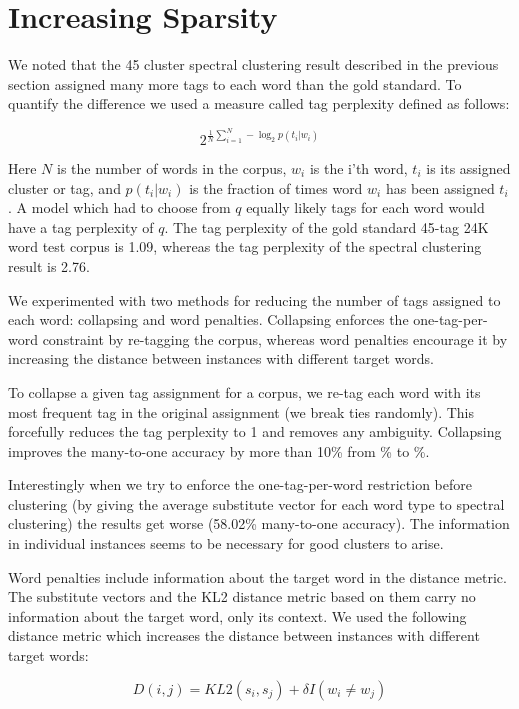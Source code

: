 \section{Increasing Sparsity}
\label{sec:sparsity}

We noted that the 45 cluster spectral clustering result described in
the previous section assigned many more tags to each word than the
gold standard.  To quantify the difference we used a measure called
tag perplexity defined as follows:

\[ 2^{\frac{1}{N}\sum_{i=1}^N -\log_2 p(t_i | w_i)} \]

Here $N$ is the number of words in the corpus, $w_i$ is the i'th word,
$t_i$ is its assigned cluster or tag, and $p(t_i|w_i)$ is the fraction
of times word $w_i$ has been assigned $t_i$.  A model which had to
choose from $q$ equally likely tags for each word would have a tag
perplexity of $q$.  The tag perplexity of the gold standard 45-tag 24K
word test corpus is 1.09, whereas the tag perplexity of the spectral
clustering result is 2.76.

We experimented with two methods for reducing the number of tags
assigned to each word: collapsing and word penalties.  Collapsing
enforces the one-tag-per-word constraint by re-tagging the corpus,
whereas word penalties encourage it by increasing the distance between
instances with different target words.

To collapse a given tag assignment for a corpus, we re-tag each word
with its most frequent tag in the original assignment (we break ties
randomly).  This forcefully reduces the tag perplexity to 1 and
removes any ambiguity.  Collapsing improves the many-to-one accuracy
by more than 10\% from \spectralResult\% to \collapseResult\%.

Interestingly when we try to enforce the one-tag-per-word restriction
before clustering (by giving the average substitute vector for each
word type to spectral clustering) the results get worse (58.02\%
many-to-one accuracy).  The information in individual instances seems
to be necessary for good clusters to arise.

Word penalties include information about the target word in the
distance metric.  The substitute vectors and the KL2 distance metric
based on them carry no information about the target word, only its
context.  We used the following distance metric which increases the
distance between instances with different target words:

\[ D(i, j) = KL2(s_i,s_j)+\delta I(w_i \neq w_j) \]

